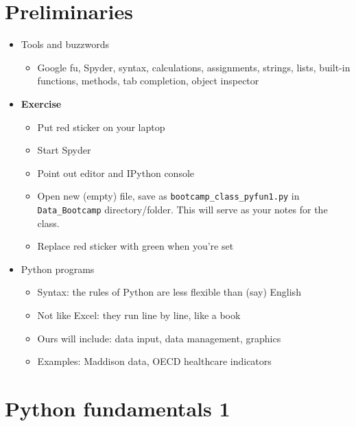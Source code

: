 \section*{Preliminaries}

\begin{itemize}

\item Tools and buzzwords
\begin{itemize}
\item Google fu, Spyder, syntax, calculations, assignments, strings, lists, built-in functions, methods, tab completion, object inspector
\end{itemize}

\item {\bf Exercise}
\begin{itemize}
\item Put red sticker on your laptop
\item Start Spyder
\item Point out editor and IPython console
\item Open new (empty) file, save as \verb|bootcamp_class_pyfun1.py| in \verb|Data_Bootcamp| directory/folder.  This will serve as your notes for the class.
\item Replace red sticker with green when you're set
\end{itemize}


\item Python programs
\begin{itemize}
\item Syntax:  the rules of Python are less flexible than (say) English
\item Not like Excel: they run line by line, like a book
\item Ours will include:  data input, data management, graphics
\item Examples:  Maddison data, OECD healthcare indicators
\end{itemize}
\end{itemize}


\section*{Python fundamentals 1}

